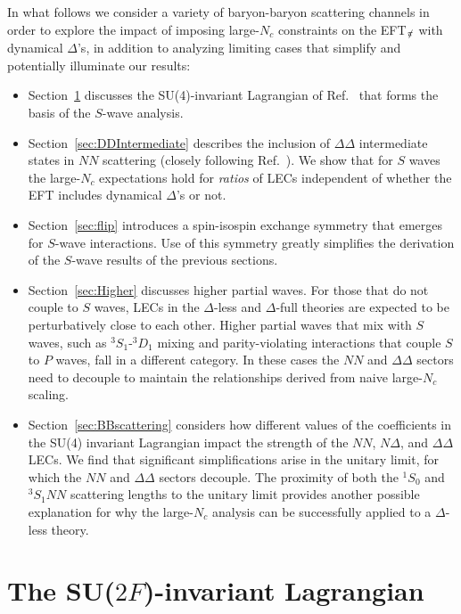 \documentclass[nofootinbib, preprint, aps, prc, superscriptaddress,11pt]{revtex4-1}
\newcommand{\Nc}{\ensuremath{N_c}\xspace}
\newcommand{\NN}{\ensuremath{N\!N}\xspace}
\newcommand{\oneS}{\ensuremath{{{}^{1}\!S_0}}\xspace}
\newcommand{\threeS}{\ensuremath{{{}^{3}\!S_1}}\xspace}
\newcommand{\threeD}{\ensuremath{{{}^{3}\!D_1}}\xspace}
\newcommand\Swave{$S$-wave\xspace}
\newcommand\SD{\ensuremath{\threeS\text{-}\threeD}\xspace}
\newcommand{\1}{\mathbbm{1}}
\newcommand{\nopi}{\ensuremath{\pi\hskip-0.40em /}}
\newcommand{\eftnopi}{EFT$_{\nopi}$\xspace}
\newcommand{\D}{\ensuremath{\Delta}\xspace}
\newcommand{\DD}{\ensuremath{\Delta\Delta}\xspace}
\newcommand{\ND}{\ensuremath{N\!\Delta}\xspace}
\begin{document}
In what follows we consider a variety of baryon-baryon scattering channels in order to explore the impact of imposing large-\Nc constraints on the \eftnopi with dynamical $\Delta$'s, in addition to analyzing limiting cases that simplify and potentially illuminate our results:  
\begin{itemize}
    \item Section~\ref{sec:background} discusses the SU(4)-invariant Lagrangian of Ref.~\cite{Kaplan:1995yg} that forms the basis of the \Swave  analysis.
    \item Section~\ref{sec:DDIntermediate} describes the inclusion of $\Delta\Delta$ intermediate states in \NN scattering (closely following Ref.~\cite{Savage:1996tb}).
We show that for $S$ waves the large-\Nc expectations  hold for \emph{ratios} of LECs independent of whether the EFT includes dynamical \D's or not. 
    \item Section~\ref{sec:flip} introduces a spin-isospin exchange symmetry that emerges for \Swave interactions. Use of this symmetry greatly simplifies the derivation of the  \Swave results  of the previous sections. 
    \item Section~\ref{sec:Higher} discusses higher partial waves. 
For those that do not couple to $S$ waves, LECs in the \D-less and \D-full theories are expected to be perturbatively close to each other. 
Higher partial waves that mix with $S$ waves, such as \SD mixing and parity-violating interactions that couple $S$ to $P$ waves, fall in a different category. 
In these cases the \NN and \DD sectors need to decouple to maintain the relationships derived from naive large-\Nc scaling.
    \item Section~\ref{sec:BBscattering} considers how different values of the coefficients in the SU(4)  invariant Lagrangian impact the strength of the \NN, $\ND$, and \DD LECs.
We find that significant simplifications arise in the unitary limit, for which the \NN and \DD sectors decouple. 
The proximity of both the \oneS and \threeS \NN scattering lengths to the unitary limit provides another possible explanation for why the large-\Nc analysis can be successfully applied to a \D-less theory.
\end{itemize}


\section{The SU($2F$)-invariant Lagrangian}
\label{sec:background}
\end{document}
